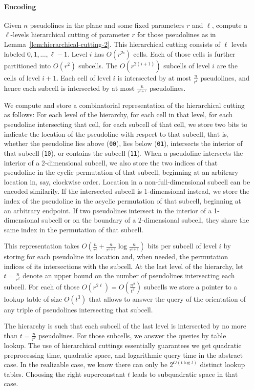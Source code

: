 \paragraph*{Encoding}
Given \(n\) pseudolines in the plane and some fixed
parameters \(r\) and \(\ell\), compute a \(\ell\)-levels hierarchical cutting
of parameter \(r\) for those
pseudolines as in Lemma~\ref{lem:hierarchical-cutting-2}.
This hierarchical cutting consists of \( \ell \) levels
labeled \(0,1,\ldots,\ell-1\). Level \(i\) has \(O(r^{2i})\)
cells. Each of those cells is further partitioned into
\(O(r^2)\) subcells. The \(O(r^{2(i+1)})\) subcells of level \(i\)
are the cells of level \(i+1\). Each cell of level \(i\) is intersected by at
most \(\frac{n}{r^i}\) pseudolines, and hence each subcell is intersected by at
most \(\frac{n}{r^{i+1}}\) pseudolines.

We compute and store a combinatorial representation of the hierarchical cutting
as follows: For each level of the hierarchy, for each cell in that level, for
each pseudoline intersecting that cell, for each subcell of that cell, we store
two bits to indicate the location of the pseudoline with respect to that
subcell\ifeurocg\else, that is, whether the pseudoline lies above
(\texttt{00}), lies below (\texttt{01}), intersects the interior of that
subcell (\texttt{10}), or contains the subcell (\texttt{11})\fi.
When a pseudoline intersects the interior of a 2-dimensional subcell, we also
store the two indices of that pseudoline
in the cyclic permutation of that subcell, beginning at an
arbitrary location in, say, clockwise order.
\ifeurocg%
Location in a non-full-dimensional subcell can be encoded similarily.
\else%
If the intersected subcell is
1-dimensional instead, we store the index of the pseudoline in the acyclic
permutation of that subcell, beginning at an arbitrary endpoint.
If two pseudolines intersect in the interior of a 1-dimensional subcell or on
the boundary of a 2-dimensional subcell, they share the same index in the
permutation of that subcell.
\fi%

\ifeurocg\else
This representation takes \(O(\frac{n}{r^i} + \frac{n}{r^{i+1}}
\log{\frac{n}{r^{i+1}}})\) bits per subcell of level \(i\) by storing for each
pseudoline its location and, when needed, the permutation indices of its
intersections with the subcell. At the last level of the hierarchy, let \(t =
\frac{n}{r^\ell}\) denote an upper bound on the number of pseudolines
intersecting each subcell. For each of those \(O(r^{2 \ell}) =
O(\frac{n^2}{t^2})\) subcells we store a pointer to a lookup table of size
\(O(t^3)\) that allows to answer the query of the orientation of any
triple of pseudolines intersecting that subcell.
\fi

\ifeurocg
The hierarchy is such that each subcell of the last level is intersected by no
more than \(t = \frac{n}{r^\ell}\) pseudolines.
For those subcells, we answer the queries by table lookup.
The use of hierarchical cuttings essentially guarantees we get quadratic
preprocessing time, quadratic space, and logarithmic query time in the abstract
case. In the realizable case, we know there can only be \(2^{O(t \log t)}\)
distinct lookup tables. Choosing the right superconstant \(t\) leads to
subquadratic space in that case.
\fi
